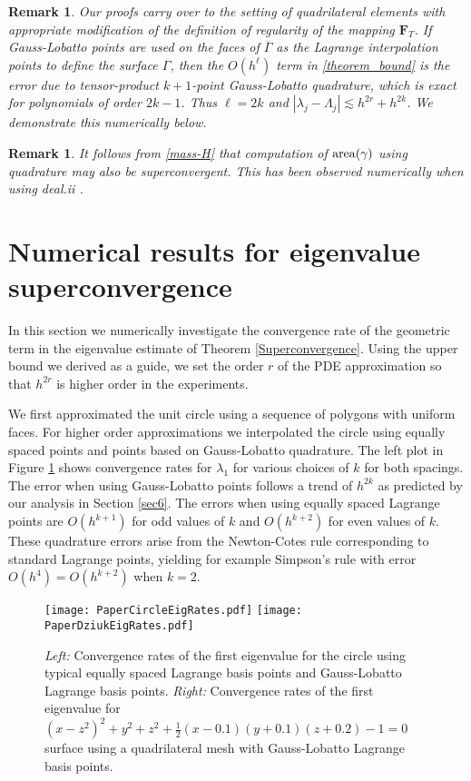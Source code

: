\documentclass{siamart0516}
\newcommand{\bF}{\ensuremath{\boldsymbol F}}
\newtheorem{remark}[theorem]{Remark}
\numberwithin{equation}{section}
\numberwithin{theorem}{section}
\numberwithin{figure}{section}
\begin{document}
\begin{remark}
Our proofs carry over to the setting of quadrilateral elements with appropriate modification of the definition of regularity of the mapping $\bF_T$. If Gauss-Lobatto points are used on the faces of $\overline{\Gamma}$ as the Lagrange interpolation points to define the surface $\Gamma$, then the $O(h^\ell)$ term in \eqref{theorem_bound} is the error due to tensor-product $k+1$-point Gauss-Lobatto quadrature, which is exact for polynomials of order $2k-1$. Thus $\ell = 2k$ and $|\lambda_j-\Lambda_j|\lesssim h^{2r} + h^{2k}$. We demonstrate this numerically below. 
\end{remark}
\begin{remark} It follows from \eqref{mass-H} that computation of ${\rm area}(\gamma)$ using quadrature may also be superconvergent.  This has been observed numerically when using deal.ii \cite[Step 10 Tutorial]{BHK:07}.  
\end{remark}

\section{Numerical results for eigenvalue superconvergence} \label{sec7}
In this section we numerically investigate the convergence rate of the geometric term in the eigenvalue estimate of Theorem \ref{Superconvergence}. Using the upper bound we derived as a guide, we set the order $r$ of the PDE approximation so that $h^{2r}$ is higher order in the experiments.  

We first approximated the unit circle using a sequence of polygons with uniform faces.  For higher order approximations we interpolated the circle using equally spaced points and points based on Gauss-Lobatto quadrature. The left plot in Figure \ref{figcirceigs} shows convergence rates for $\lambda_1$ for various choices of $k$ for both spacings. The error when using Gauss-Lobatto points follows a trend of $h^{2k}$ as predicted by our analysis in Section \ref{sec6}. The errors when using equally spaced Lagrange points are  $O(h^{k+1})$ for odd values of $k$ and $O(h^{k+2})$ for even values of $k$. These quadrature errors arise from the Newton-Cotes rule corresponding to standard Lagrange points, yielding for example Simpson's rule with error $O(h^4)=O(h^{k+2})$ when $k=2$.   
 \setlength{\unitlength}{.75cm}
 \begin{figure}[h]
  	\label{figcirceigs}
 	\centering
 	\texttt{[image: PaperCircleEigRates.pdf]}
		\texttt{[image: PaperDziukEigRates.pdf]}
 	\caption{{\it Left:}  Convergence rates of the first eigenvalue for the circle using typical equally spaced Lagrange basis points and Gauss-Lobatto Lagrange basis points.  {\it Right:} Convergence rates of the first eigenvalue for $(x-z^2)^2 + y^2 + z^2 +\frac{1}{2}(x-0.1)(y+0.1)(z+0.2) - 1 = 0$ surface using a quadrilateral mesh with Gauss-Lobatto Lagrange basis points.}
 \end{figure}
 
\end{document}
